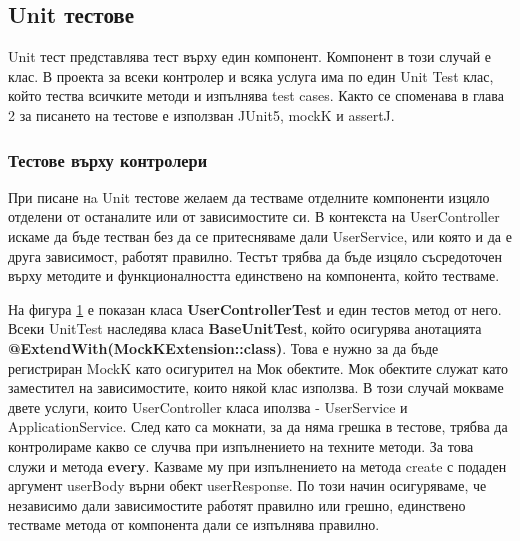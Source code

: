     \subsection{Unit тестове}
    Unit тест представлява тест върху един компонент. Компонент в този случай е клас. В проекта за всеки контролер и всяка услуга има по един Unit Test клас, който тества всичките методи и изпълнява test cases. Както се споменава в глава 2 за писането на тестове е използван JUnit5, mockK и assertJ.
    
        \subsubsection{Тестове върху контролери}
        При писане нa Unit тестове желаем да тестваме отделните компоненти изцяло отделени от останалите или от зависимостите си. В контекста на UserController искаме да бъде тестван без да се притесняваме дали UserService, или която и да е друга зависимост, работят правилно. Тестът трябва да бъде изцяло съсредоточен върху методите и функционалността единствено на компонента, който тестваме.
        
        \begin{figure}[h]
            \centering
            \caption{}
            \label{fig:user_controller_test}
        \end{figure}
        
        На фигура \ref{fig:user_controller_test} е показан класа \textbf{UserControllerTest} и един тестов метод от него. Всеки UnitTest наследява класа \textbf{BaseUnitTest}, който осигурява анотацията \textbf{@ExtendWith(MockKExtension::class)}. Това е нужно за да бъде регистриран MockK като осигурител на Мок обектите. Мок обектите служат като заместител на зависимостите, които някой клас използва. В този случай мокваме двете услуги, които UserController класа иползва - UserService и ApplicationService. След като са мокнати, за да няма грешка в тестове, трябва
        да контролираме какво се случва при изпълнението на техните методи. За това служи и метода \textbf{every}. Казваме му при изпълнението на метода create с подаден аргумент userBody върни обект userResponse. По този начин осигуряваме, че независимо дали зависимостите работят правилно или грешно, единствено тестваме метода от компонента дали се изпълнява правилно.
        
